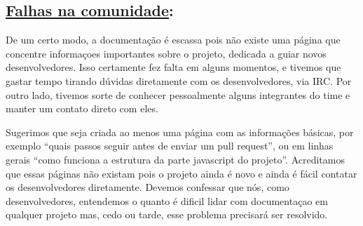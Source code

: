 \subsection*{\underline{Falhas na comunidade}:}

De um certo modo, a documentação é escassa pois não existe uma página que
concentre informaçoes importantes sobre o projeto, dedicada a guiar novos
desenvolvedores. Isso certamente fez falta em alguns momentos, e tivemos que
gastar tempo tirando dúvidas diretamente com os desenvolvedores, via IRC. Por
outro lado, tivemos sorte de conhecer pessoalmente alguns integrantes do time
e manter um contato direto com eles.

Sugerimos que seja criada ao menos uma página com as informações básicas, por
exemplo ``quais passos seguir antes de enviar um pull request'', ou em linhas
gerais ``como funciona a estrutura da parte javascript do projeto''.
Acreditamos que essas páginas não existam pois o projeto ainda é novo e ainda é
fácil contatar os desenvolvedores diretamente. Devemos confessar que nós, como
desenvolvedores, entendemos o quanto é dificil lidar com documentaçao em
qualquer projeto mas, cedo ou tarde, esse problema precisará ser resolvido.